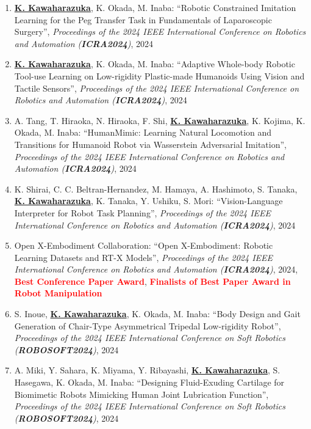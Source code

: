 \documentclass[letterpaper]{article}
\begin{document}
\begin{enumerate}
\item \underline{\textbf{K. Kawaharazuka}}, K. Okada, M. Inaba: ``Robotic Constrained Imitation Learning for the Peg Transfer Task in Fundamentals of Laparoscopic Surgery'', \textit{Proceedings of the 2024 IEEE International Conference on Robotics and Automation (\textit{\textbf{ICRA2024}})}, 2024
\item \underline{\textbf{K. Kawaharazuka}}, K. Okada, M. Inaba: ``Adaptive Whole-body Robotic Tool-use Learning on Low-rigidity Plastic-made Humanoids Using Vision and Tactile Sensors'', \textit{Proceedings of the 2024 IEEE International Conference on Robotics and Automation (\textit{\textbf{ICRA2024}})}, 2024
\item A. Tang, T. Hiraoka, N. Hiraoka, F. Shi, \underline{\textbf{K. Kawaharazuka}}, K. Kojima, K. Okada, M. Inaba: ``HumanMimic: Learning Natural Locomotion and Transitions for Humanoid Robot via Wasserstein Adversarial Imitation'', \textit{Proceedings of the 2024 IEEE International Conference on Robotics and Automation (\textit{\textbf{ICRA2024}})}, 2024
\item K. Shirai, C. C. Beltran-Hernandez, M. Hamaya, A. Hashimoto, S. Tanaka, \underline{\textbf{K. Kawaharazuka}}, K. Tanaka, Y. Ushiku, S. Mori: ``Vision-Language Interpreter for Robot Task Planning'', \textit{Proceedings of the 2024 IEEE International Conference on Robotics and Automation (\textit{\textbf{ICRA2024}})}, 2024
\item Open X-Embodiment Collaboration: ``Open X-Embodiment: Robotic Learning Datasets and RT-X Models'', \textit{Proceedings of the 2024 IEEE International Conference on Robotics and Automation (\textit{\textbf{ICRA2024}})}, 2024, \textbf{\textcolor{red}{Best Conference Paper Award}}, \textbf{\textcolor{red}{Finalists of Best Paper Award in Robot Manipulation}}
\item S. Inoue, \underline{\textbf{K. Kawaharazuka}}, K. Okada, M. Inaba: ``Body Design and Gait Generation of Chair-Type Asymmetrical Tripedal Low-rigidity Robot'', \textit{Proceedings of the 2024 IEEE International Conference on Soft Robotics (\textit{\textbf{ROBOSOFT2024}})}, 2024
\item A. Miki, Y. Sahara, K. Miyama, Y. Ribayashi, \underline{\textbf{K. Kawaharazuka}}, S. Hasegawa, K. Okada, M. Inaba: ``Designing Fluid-Exuding Cartilage for Biomimetic Robots Mimicking Human Joint Lubrication Function'', \textit{Proceedings of the 2024 IEEE International Conference on Soft Robotics (\textit{\textbf{ROBOSOFT2024}})}, 2024

\end{enumerate}
\end{document}
